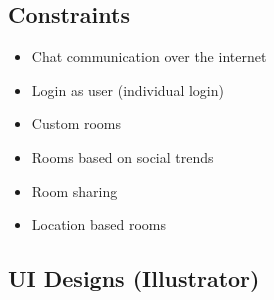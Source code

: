 \documentclass[11pt,english,numbers=endperiod,parskip=half]{scrartcl}
\begin{document}
  \subsection{Constraints}
    \begin{itemize}
      \item{Chat communication over the internet}
      \item{Login as user (individual login)}
      \item{Custom rooms}
      \item{Rooms based on social trends}
      \item{Room sharing}
      \item{Location based rooms}
    \end{itemize}

  \subsection{UI Designs (Illustrator)}
    \begin{figure}[H]
    \\
    \end{figure}
    \begin{figure}[H]
    \\
    \end{figure}
\end{document}
